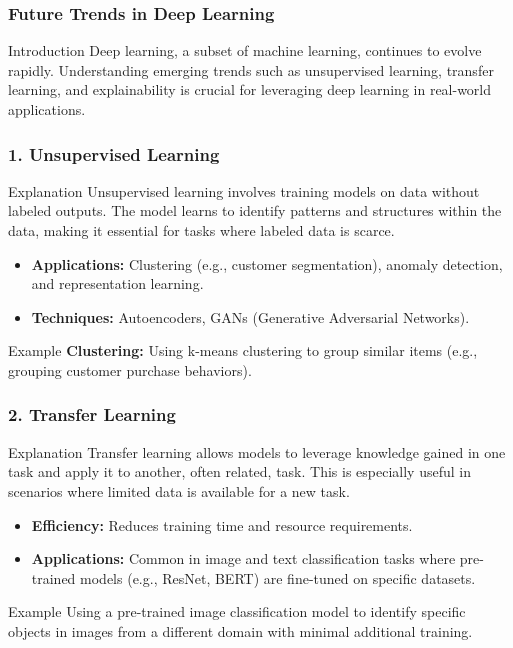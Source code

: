 \documentclass[aspectratio=169]{beamer}
\begin{document}
\begin{frame}[fragile]
    \frametitle{Future Trends in Deep Learning}
    \begin{block}{Introduction}
        Deep learning, a subset of machine learning, continues to evolve rapidly. Understanding emerging trends such as unsupervised learning, transfer learning, and explainability is crucial for leveraging deep learning in real-world applications.
    \end{block}
\end{frame}

\begin{frame}[fragile]
    \frametitle{1. Unsupervised Learning}
    \begin{block}{Explanation}
        Unsupervised learning involves training models on data without labeled outputs. The model learns to identify patterns and structures within the data, making it essential for tasks where labeled data is scarce.
    \end{block}
    
    \begin{itemize}
        \item \textbf{Applications:} Clustering (e.g., customer segmentation), anomaly detection, and representation learning.
        \item \textbf{Techniques:} Autoencoders, GANs (Generative Adversarial Networks).
    \end{itemize}
    
    \begin{block}{Example}
        \textbf{Clustering:} Using k-means clustering to group similar items (e.g., grouping customer purchase behaviors).
    \end{block}
\end{frame}

\begin{frame}[fragile]
    \frametitle{2. Transfer Learning}
    \begin{block}{Explanation}
        Transfer learning allows models to leverage knowledge gained in one task and apply it to another, often related, task. This is especially useful in scenarios where limited data is available for a new task.
    \end{block}
    
    \begin{itemize}
        \item \textbf{Efficiency:} Reduces training time and resource requirements.
        \item \textbf{Applications:} Common in image and text classification tasks where pre-trained models (e.g., ResNet, BERT) are fine-tuned on specific datasets.
    \end{itemize}
    
    \begin{block}{Example}
        Using a pre-trained image classification model to identify specific objects in images from a different domain with minimal additional training.
    \end{block}
\end{frame}
\end{document}
